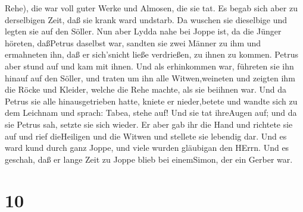 Rehe), die war voll guter Werke und Almosen, die sie tat. 
Es begab sich aber zu derselbigen Zeit, daß sie krank ward undstarb. Da
wuschen sie dieselbige und legten sie auf den Söller.  Nun
aber Lydda nahe bei Joppe ist, da die Jünger höreten, daßPetrus daselbst
war, sandten sie zwei Männer zu ihm und ermahneten ihn, daß er
sich'snicht ließe verdrießen, zu ihnen zu kommen.  Petrus
aber stund auf und kam mit ihnen. Und als erhinkommen war, führeten sie
ihn hinauf auf den Söller, und traten um ihn alle Witwen,weineten und
zeigten ihm die Röcke und Kleider, welche die Rehe machte, als sie
beiihnen war.  Und da Petrus sie alle hinausgetrieben
hatte, kniete er nieder,betete und wandte sich zu dem Leichnam und
sprach: Tabea, stehe auf! Und sie tat ihreAugen auf; und da sie Petrus
sah, setzte sie sich wieder.  Er aber gab ihr die Hand und
richtete sie auf und rief dieHeiligen und die Witwen und stellete sie
lebendig dar.  Und es ward kund durch ganz Joppe, und viele
wurden gläubigan den HErrn.  Und es geschah, daß er lange
Zeit zu Joppe blieb bei einemSimon, der ein Gerber war.

\hypertarget{section-9}{%
\section{10}\label{section-9}}


